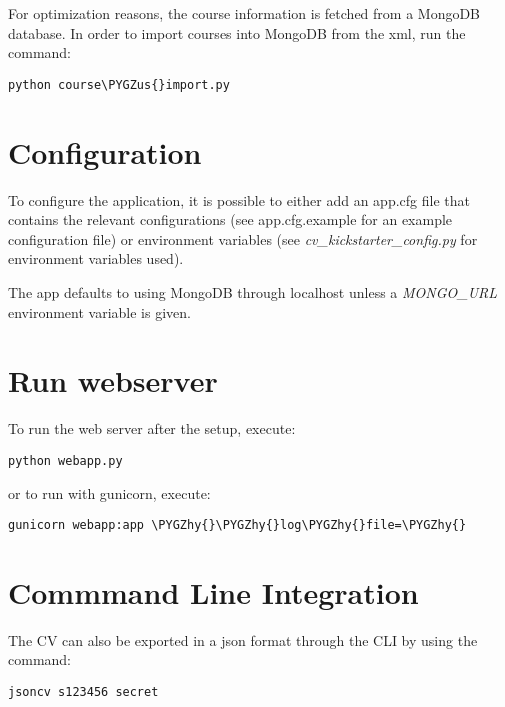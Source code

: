 \documentclass[letterpaper,10pt,english]{sphinxmanual}
\def\PYGZus{\char`\_}
\def\PYGZhy{\char`\-}
\begin{document}
For optimization reasons, the course information is fetched from a MongoDB database. In order to import courses into MongoDB from the xml, run the command:

\begin{Verbatim}[commandchars=\\\{\}]
python course\PYGZus{}import.py
\end{Verbatim}


\section{Configuration}
\label{index:configuration}
To configure the application, it is possible to either add an app.cfg file that contains the relevant configurations (see app.cfg.example for an example configuration file) or environment variables (see \emph{cv\_kickstarter\_config.py} for environment variables used).

The app defaults to using MongoDB through localhost unless a \emph{MONGO\_URL} environment variable is given.


\section{Run webserver}
\label{index:run-webserver}
To run the web server after the setup, execute:

\begin{Verbatim}[commandchars=\\\{\}]
python webapp.py
\end{Verbatim}

or to run with gunicorn, execute:

\begin{Verbatim}[commandchars=\\\{\}]
gunicorn webapp:app \PYGZhy{}\PYGZhy{}log\PYGZhy{}file=\PYGZhy{}
\end{Verbatim}


\section{Commmand Line Integration}
\label{index:commmand-line-integration}
The CV can also be exported in a json format through the CLI by using the command:

\begin{Verbatim}[commandchars=\\\{\}]
jsoncv s123456 secret
\end{Verbatim}
\end{document}
